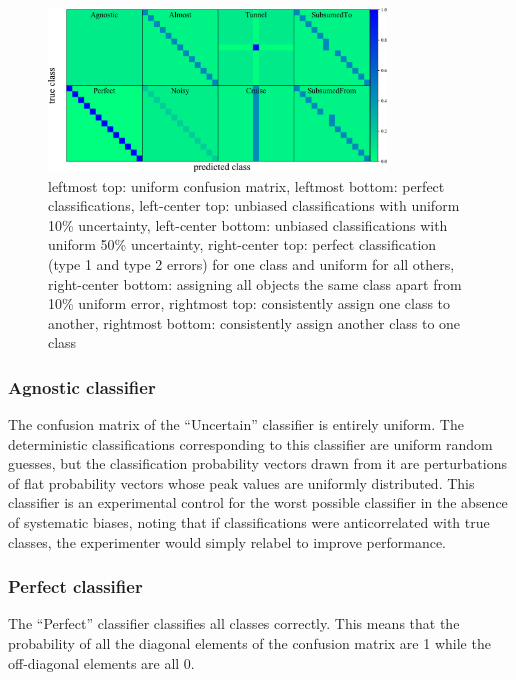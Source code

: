 \begin{figure}
	\begin{center}
    \includegraphics[width=0.8\textwidth]{./fig/all_sim_cm.png}
		\caption{leftmost top: uniform confusion matrix,
    leftmost bottom: perfect classifications,
    left-center top: unbiased classifications with uniform 10\% uncertainty,
    left-center bottom: unbiased classifications with uniform 50\% uncertainty,
    right-center top: perfect classification (type 1 and type 2 errors) for one class and uniform for all others,
    right-center bottom: assigning all objects the same class apart from 10\% uniform error,
    rightmost top: consistently assign one class to another,
    rightmost bottom: consistently assign another class to one class}
		\label{fig:mock_cm}
	\end{center}
\end{figure}

\subsubsection{Agnostic classifier}
\label{sec:agnostic_data}

The confusion matrix of the ``Uncertain'' classifier is entirely uniform.
The deterministic classifications corresponding to this classifier are uniform random guesses, but the classification probability vectors drawn from it are perturbations of flat probability vectors whose peak values are uniformly distributed.
This classifier is an experimental control for the worst possible classifier in the absence of systematic biases, noting that if classifications were anticorrelated with true classes, the experimenter would simply relabel to improve performance.

\subsubsection{Perfect classifier}
\label{sec:perfect_data}

The ``Perfect'' classifier classifies all classes correctly.
This means that the probability of all the diagonal elements of the confusion matrix are 1 while the off-diagonal elements are all 0.

